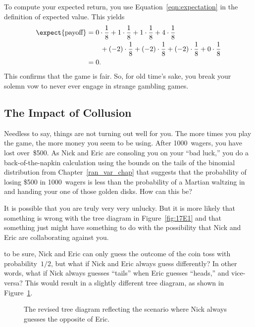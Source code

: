 To compute your expected return, you use
Equation~\ref{eqn:expectation} in the definition of expected value.
This yields
\begin{align*}
\expect{\text{payoff}}
    &= 0 \cdot \frac{1}{8} + 1 \cdot \frac{1}{8} + 1 \cdot \frac{1}{8}
        + 4 \cdot \frac{1}{8} \\
        & \qquad {}+ (-2) \cdot \frac{1}{8} + (-2) \cdot \frac{1}{8}
        + (-2) \cdot \frac{1}{8}
        + 0 \cdot \frac{1}{8} \\
    &= 0.
\end{align*}
This confirms that the game is fair.  So, for old time's sake, you
break your solemn vow to never ever engage in strange gambling games.

\subsection{The Impact of Collusion}


Needless to say, things are not turning out well for you.  The more
times you play the game, the more money you seem to be using.  After
1000~wagers, you have lost over~\$500.  As Nick and Eric are consoling
you on your ``bad luck,'' you do a back-of-the-napkin calculation
using the bounds on the tails of the binomial distribution from
Chapter~\ref{ran_var_chap} that suggests that the probability of
losing \$500 in 1000~wagers is less than the probability of a Martian
waltzing in and handing your one of those golden disks.  How can this
be?

It is possible that you are truly very very unlucky.  But it is more
likely that something is wrong with the tree diagram in
Figure~\ref{fig:17E1} and that something just might have something to
do with the possibility that Nick and Eric are collaborating against
you.

to be sure, Nick and Eric can only guess the outcome of the coin toss
with probability~$1/2$, but what if Nick and Eric always guess
differently?  In other words, what if Nick always guesses ``tails''
when Eric guesses ``heads,'' and vice-versa?  This would result in a
slightly different tree diagram, as shown in Figure~\ref{fig:17E2}.

\begin{figure}



\caption{The revised tree diagram reflecting the scenario where Nick
  always guesses the opposite of Eric.}

\label{fig:17E2}

\end{figure}

